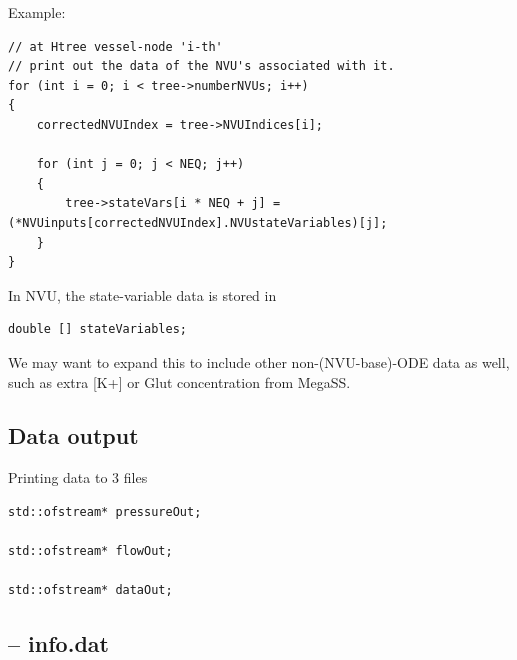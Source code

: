 Example:
\begin{verbatim}
// at Htree vessel-node 'i-th'
// print out the data of the NVU's associated with it.
for (int i = 0; i < tree->numberNVUs; i++)
{
    correctedNVUIndex = tree->NVUIndices[i];

    for (int j = 0; j < NEQ; j++)
    {
        tree->stateVars[i * NEQ + j] = (*NVUinputs[correctedNVUIndex].NVUstateVariables)[j];
    }
}
\end{verbatim}

In NVU, the state-variable data is stored in 
\begin{verbatim}
double [] stateVariables;
\end{verbatim}
We may want to expand this to include other non-(NVU-base)-ODE data as well,
such as extra [K+] or Glut concentration from MegaSS. 



\subsection{Data output}

Printing data to 3 files
\begin{verbatim}
std::ofstream* pressureOut;

std::ofstream* flowOut;

std::ofstream* dataOut;
\end{verbatim}

\subsection{-- info.dat}

